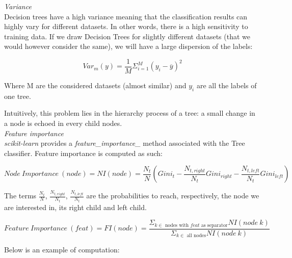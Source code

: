 \textit{Variance} \\

Decision trees have a high variance meaning that the classification results can highly vary for different datasets. In other words, there is a high sensitivity to training data. If we draw Decision Trees for slightly different datasets (that we would however consider the same), we will have a large dispersion of the labels:

$$Var_m(y) = \frac{1}{M}\Sigma_{i=1}^M(y_i - \overline{y})^2$$

Where M are the considered datasets (almost similar) and $y_i$ are all the labels of one tree.

Intuitively, this problem lies in the hierarchy process of a tree: a small change in a node is echoed in every child nodes. \\

\textit{Feature importance} \\

\textit{scikit-learn} provides a \textit{feature\_importance\_} method associated with the Tree classifier. Feature importance is computed as such:

$$Node~Importance~(node) = NI(node) = \frac{N_t}{N}(Gini_t - \frac{N_{t,right}}{N_t}Gini_{right} - \frac{N_{t,left}}{N_t}Gini_{left})$$

The terms $\frac{N_t}{N}$,  $\frac{N_{t,right}}{N_t}$, $\frac{N_{t,left}}{N_t}$ are the probabilities to reach, respectively, the node we are interested in, its right child and left child.

$$Feature~Importance~(feat) = FI(node) = \frac{\Sigma_{k \in \text{ nodes with } \textit{feat } \text{as separator}}NI(node~k)}{\Sigma_{k \in \text{ all nodes}}NI(node~k)}$$

Below is an example of computation:

